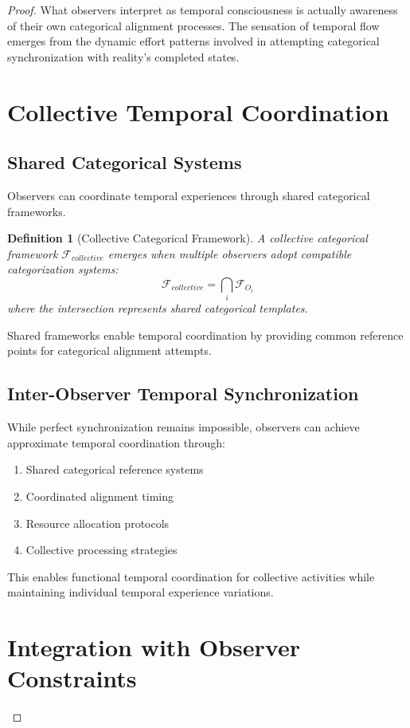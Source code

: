 \documentclass[12pt,a4paper]{article}
\newtheorem{definition}{Definition}
\begin{document}
\begin{proof}
What observers interpret as temporal consciousness is actually awareness of their own categorical alignment processes. The sensation of temporal flow emerges from the dynamic effort patterns involved in attempting categorical synchronization with reality's completed states.

\section{Collective Temporal Coordination}

\subsection{Shared Categorical Systems}

Observers can coordinate temporal experiences through shared categorical frameworks.

\begin{definition}[Collective Categorical Framework]
A collective categorical framework $\mathcal{F}_{collective}$ emerges when multiple observers adopt compatible categorization systems:
$$\mathcal{F}_{collective} = \bigcap_{i} \mathcal{F}_{O_i}$$
where the intersection represents shared categorical templates.
\end{definition}

Shared frameworks enable temporal coordination by providing common reference points for categorical alignment attempts.

\subsection{Inter-Observer Temporal Synchronization}

While perfect synchronization remains impossible, observers can achieve approximate temporal coordination through:
\begin{enumerate}
\item Shared categorical reference systems
\item Coordinated alignment timing
\item Resource allocation protocols
\item Collective processing strategies
\end{enumerate}

This enables functional temporal coordination for collective activities while maintaining individual temporal experience variations.

\section{Integration with Observer Constraints}


\end{proof}
\end{document}
